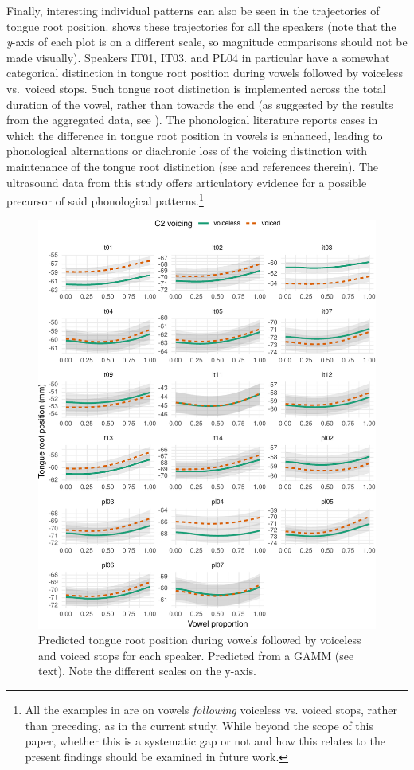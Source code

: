 \documentclass[preprint]{JASAnew}
\begin{document}
Finally, interesting individual patterns can also be seen in the
trajectories of tongue root position.  shows these
trajectories for all the speakers (note that the \emph{y}-axis of each
plot is on a different scale, so magnitude comparisons should not be
made visually). Speakers IT01, IT03, and PL04 in particular have a
somewhat categorical distinction in tongue root position during vowels
followed by voiceless vs.~voiced stops. Such tongue root distinction is
implemented across the total duration of the vowel, rather than towards
the end (as suggested by the results from the aggregated data, see
). The phonological literature reports cases in which the
difference in tongue root position in vowels is enhanced, leading to
phonological alternations or diachronic loss of the voicing distinction
with maintenance of the tongue root distinction (see \citealt{vaux1996}
and references therein). The ultrasound data from this study offers
articulatory evidence for a possible precursor of said phonological
patterns.\footnote{All the examples in \citet{vaux1996} are on vowels \textit{following} voiceless vs. voiced stops, rather than preceding, as in the current study. While beyond the scope of this paper, whether this is a systematic gap or not and how this relates to the present findings should be examined in future work.}

\begin{figure}
\includegraphics[width=\linewidth]{./Figure10-1} \caption{Predicted tongue root position during vowels followed by voiceless and voiced stops for each speaker. Predicted from a GAMM (see text). Note the different scales on the y-axis.}\label{f:Figure10}
\end{figure}
\end{document}
